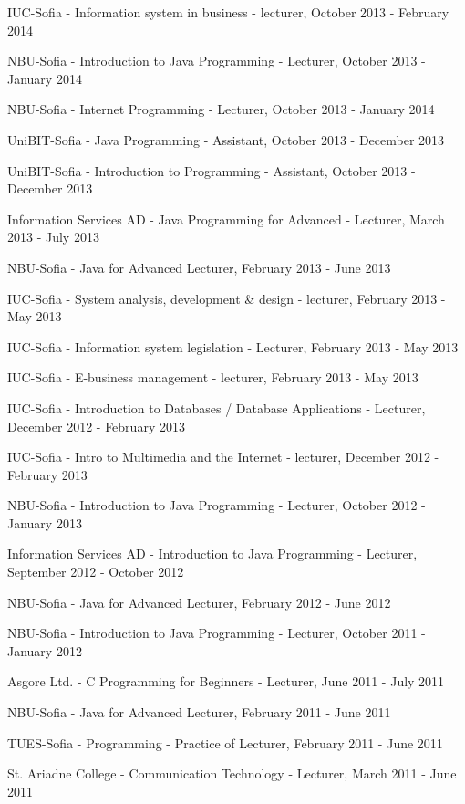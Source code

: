 \documentclass[english,a4paper]{europasscv}
\begin{document}
\begin{europasscv}
{\begin{ecvitemize}
    \item IUC-Sofia - Information system in business - lecturer, October 2013 - February 2014
    \item NBU-Sofia - Introduction to Java Programming - Lecturer, October 2013 - January 2014
    \item NBU-Sofia - Internet Programming - Lecturer, October 2013 - January 2014
    \item UniBIT-Sofia - Java Programming - Assistant, October 2013 - December 2013
    \item UniBIT-Sofia - Introduction to Programming - Assistant, October 2013 - December 2013
    \item Information Services AD - Java Programming for Advanced - Lecturer, March 2013 - July 2013
    \item NBU-Sofia - Java for Advanced Lecturer, February 2013 - June 2013
    \item IUC-Sofia - System analysis, development \& design - lecturer, February 2013 - May 2013
    \item IUC-Sofia - Information system legislation - Lecturer, February 2013 - May 2013
    \item IUC-Sofia - E-business management - lecturer, February 2013 - May 2013
    \item IUC-Sofia - Introduction to Databases / Database Applications - Lecturer, December 2012 - February 2013
    \item IUC-Sofia - Intro to Multimedia and the Internet - lecturer, December 2012 - February 2013
        \item NBU-Sofia - Introduction to Java Programming - Lecturer, October 2012 - January 2013
    \item Information Services AD - Introduction to Java Programming - Lecturer, September 2012 - October 2012
    \item NBU-Sofia - Java for Advanced Lecturer, February 2012 - June 2012
    \item NBU-Sofia - Introduction to Java Programming - Lecturer, October 2011 - January 2012
    \item Asgore Ltd. - C Programming for Beginners - Lecturer, June 2011 - July 2011
    \item NBU-Sofia - Java for Advanced Lecturer, February 2011 - June 2011
    \item TUES-Sofia - Programming - Practice of Lecturer, February 2011 - June 2011
    \item St. Ariadne College - Communication Technology - Lecturer, March 2011 - June 2011

\end{ecvitemize}}
\end{europasscv}
\end{document}
